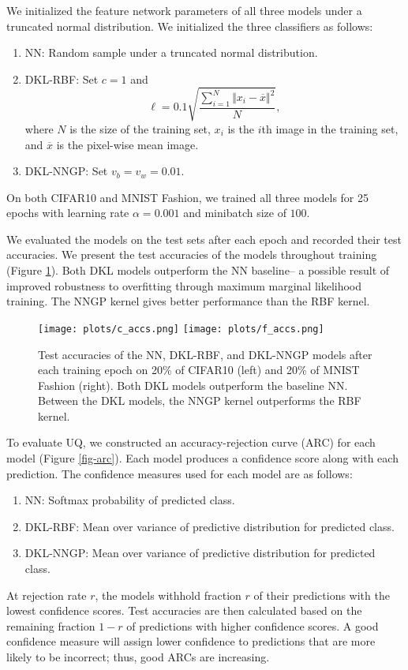 \documentclass{article}
\begin{document}
We initialized the feature network parameters of all three models under a truncated normal distribution. We initialized the three classifiers as follows:
\begin{enumerate}
\item NN: Random sample under a truncated normal distribution.
\item DKL-RBF: Set $c=1$ and
\begin{equation}
\ell = 0.1\sqrt{\frac{\sum_{i=1}^N \Vert x_i - \overline{x}\Vert^2}{N}},
\end{equation}
where $N$ is the size of the training set, $x_i$ is the $i$th image in the training set, and $\overline{x}$ is the pixel-wise mean image.
\item DKL-NNGP: Set $v_b = v_w = 0.01$.
\end{enumerate}

On both CIFAR10 and MNIST Fashion, we trained all three models for 25 epochs with learning rate $\alpha = 0.001$ and minibatch size of $100$.

We evaluated the models on the test sets after each epoch and recorded their test accuracies. We present the test accuracies of the models throughout training (Figure \ref{fig-accs}). Both DKL models outperform the NN baseline-- a possible result of improved robustness to overfitting through maximum marginal likelihood training. The NNGP kernel gives better performance than the RBF kernel.

\begin{figure}
\centering
\texttt{[image: plots/c\_accs.png]}%
\texttt{[image: plots/f\_accs.png]}
\caption{\label{fig-accs} Test accuracies of the NN, DKL-RBF, and DKL-NNGP models after each training epoch on 20\% of CIFAR10 (left) and 20\% of MNIST Fashion (right). Both DKL models outperform the baseline NN. Between the DKL models, the NNGP kernel outperforms the RBF kernel.}
\end{figure}

To evaluate UQ, we constructed an accuracy-rejection curve (ARC) for each model (Figure \ref{fig-arc}). Each model produces a confidence score along with each prediction. The confidence measures used for each model are as follows:
\begin{enumerate}
\item NN: Softmax probability of predicted class.
\item DKL-RBF: Mean over variance of predictive distribution for predicted class.
\item DKL-NNGP: Mean over variance of predictive distribution for predicted class.
\end{enumerate}
At rejection rate $r$, the models withhold fraction $r$ of their predictions with the lowest confidence scores. Test accuracies are then calculated based on the remaining fraction $1-r$ of predictions with higher confidence scores. A good confidence measure will assign lower confidence to predictions that are more likely to be incorrect; thus, good ARCs are increasing.
\end{document}
